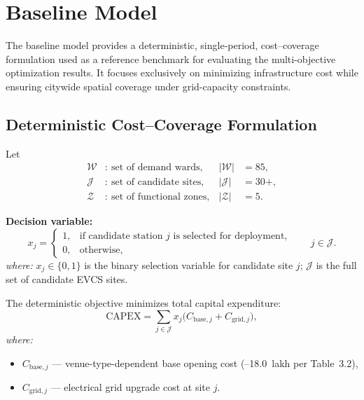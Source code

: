\section{Baseline Model}
\label{sec:baseline_model}

\noindent
The baseline model provides a deterministic, single-period, cost--coverage
formulation used as a reference benchmark for evaluating the multi-objective
optimization results. It focuses exclusively on minimizing infrastructure cost
while ensuring citywide spatial coverage under grid-capacity constraints.

\subsection{Deterministic Cost--Coverage Formulation}

Let
\begin{align*}
\mathcal{W} &:\ \text{set of demand wards},         & |\mathcal{W}| &= 85,\\
\mathcal{J} &:\ \text{set of candidate sites},      & |\mathcal{J}| &= 30+,\\
\mathcal{Z} &:\ \text{set of functional zones},     & |\mathcal{Z}| &= 5.
\end{align*}

\noindent
\textbf{Decision variable:}
\begin{equation}
x_j =
\begin{cases}
1, & \text{if candidate station } j \text{ is selected for deployment,}\\
0, & \text{otherwise,}
\end{cases}
\qquad j \in \mathcal{J}.
\label{eq:decision}
\end{equation}
\textit{where:} $x_j \in \{0,1\}$ is the binary selection variable for
candidate site $j$; $\mathcal{J}$ is the full set of candidate EVCS sites.

\medskip\noindent
The deterministic objective minimizes total capital expenditure:
\begin{equation}
\mathrm{CAPEX}
= \sum_{j \in \mathcal{J}} x_j
  \bigl(C_{\mathrm{base},j} + C_{\mathrm{grid},j}\bigr),
\label{eq:capex}
\end{equation}
\textit{where:}
\begin{itemize}
  \item $C_{\mathrm{base},j}$ — venue-type-dependent base opening cost
        (--18.0~lakh per Table~3.2),
  \item $C_{\mathrm{grid},j}$ — electrical grid upgrade cost at site $j$.
\end{itemize}

